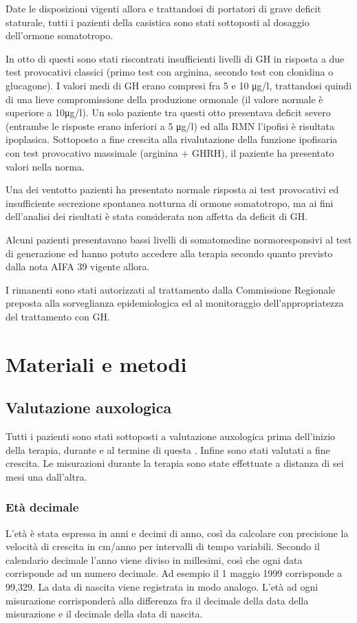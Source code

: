 Date le disposizioni vigenti allora e trattandosi di portatori di grave deficit staturale, tutti i pazienti della casistica sono stati sottoposti al dosaggio dell'ormone somatotropo. 

In otto di questi sono stati riscontrati insufficienti livelli di GH in risposta a due test provocativi classici (primo test con arginina, secondo test con clonidina o glucagone). I valori medi di GH erano compresi fra 5 e 10 \unit{\micro g}/l, trattandosi quindi di una lieve compromissione della produzione ormonale (il valore normale è superiore a 10\unit{\micro g}/l). Un solo paziente tra questi otto presentava deficit severo (entrambe le risposte erano inferiori a 5 \unit{\micro g}/l) ed alla RMN l'ipofisi è risultata ipoplasica. Sottoposto a fine crescita alla rivalutazione della funzione ipofisaria con test provocativo massimale (arginina + GHRH), il paziente ha presentato valori nella norma.

 Una dei ventotto pazienti ha presentato normale risposta ai test provocativi ed insufficiente secrezione spontanea notturna di ormone somatotropo, ma ai fini dell'analisi dei risultati è stata considerata non affetta da deficit di GH.
 
 Alcuni pazienti presentavano bassi livelli di somatomedine normoresponsivi al test di generazione ed hanno potuto accedere alla terapia secondo quanto previsto dalla nota AIFA 39 vigente allora.
 
 I rimanenti sono stati autorizzati al trattamento dalla Commissione Regionale preposta alla sorveglianza epidemiologica ed al monitoraggio dell'appropriatezza del trattamento con GH. 

\section{Materiali e metodi}

\subsection{Valutazione auxologica}
Tutti i pazienti sono stati sottoposti a valutazione auxologica prima dell'inizio della terapia, durante e al termine di questa . Infine sono stati valutati a fine crescita. Le misurazioni durante la terapia sono state effettuate a distanza di sei mesi una dall'altra.

\subsubsection*{Età decimale}
L'età è stata espressa in anni e decimi di anno, così da calcolare con precisione la velocità di crescita in cm/anno per intervalli di tempo variabili. Secondo il calendario decimale l'anno viene diviso in millesimi, così che ogni data corrisponde ad un numero decimale. Ad esempio il 1 maggio 1999 corrisponde a 99,329. La data di nascita viene registrata in modo analogo. L'età ad ogni misurazione corrisponderà alla differenza fra il decimale della data della misurazione e il decimale della data di nascita\cite{tanner1990foetus}.    


